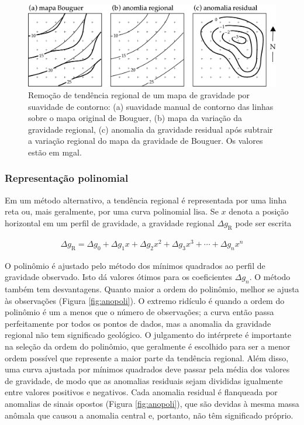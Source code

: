 \documentclass[]{book}
\theoremstyle{definition}
\theoremstyle{definition}
\theoremstyle{definition}
\theoremstyle{remark}
\begin{document}
\begin{figure}

{\centering \includegraphics[width=0.8\linewidth]{fig/Fig_02.38} 

}

\caption{Remoção de tendência regional de um mapa de gravidade por suavidade de contorno: (a) suavidade manual de contorno das linhas sobre o mapa original de Bouguer, (b) mapa da variação da gravidade regional, (c) anomalia da gravidade residual após subtrair a variação regional do mapa da gravidade de Bouguer. Os valores estão em mgal.}\label{fig:anomapa}
\end{figure}

\hypertarget{representacao-polinomial}{%
\subsubsection{Representação polinomial}\label{representacao-polinomial}}

Em um método alternativo, a tendência regional é representada por uma linha reta ou, mais geralmente, por uma curva polinomial lisa. Se \(x\) denota a posição horizontal em um perfil de gravidade, a gravidade regional \(\Delta g_\mathrm{R}\) pode ser escrita

\begin{align}
\Delta g_\mathrm{R}=\Delta g_0 + \Delta g_1 x +\Delta g_2 x^2 +\Delta g_3x^3 + \cdots + \Delta g_n x^n   \label{eq:0250}
\end{align}

O polinômio é ajustado pelo método dos mínimos quadrados ao perfil de gravidade observado. Isto dá valores ótimos para os coeficientes \(\Delta g_n\). O método também tem desvantagens. Quanto maior a ordem do polinômio, melhor se ajusta às observações (Figura \ref{fig:anopoli}). O extremo ridículo é quando a ordem do polinômio é um a menos que o número de observações; a curva então passa perfeitamente por todos os pontos de dados, mas a anomalia da gravidade regional não tem significado geológico. O julgamento do intérprete é importante na seleção da ordem do polinômio, que geralmente é escolhido para ser a menor ordem possível que represente a maior parte da tendência regional.
Além disso, uma curva ajustada por mínimos quadrados deve passar pela média dos valores de gravidade, de modo que as anomalias residuais sejam divididas igualmente entre valores positivos e negativos. Cada anomalia residual é flanqueada por anomalias de sinais opostos (Figura \ref{fig:anopoli}), que são devidas à mesma massa anômala que causou a anomalia central e, portanto, não têm significado próprio.
\end{document}
